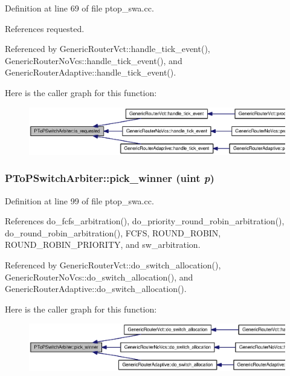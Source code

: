 Definition at line 69 of file ptop\_\-swa.cc.

References requested.

Referenced by GenericRouterVct::handle\_\-tick\_\-event(), GenericRouterNoVcs::handle\_\-tick\_\-event(), and GenericRouterAdaptive::handle\_\-tick\_\-event().

Here is the caller graph for this function:\nopagebreak
\begin{figure}[H]
\begin{center}
\leavevmode
\includegraphics[width=332pt]{classPToPSwitchArbiter_3c4eeb723ecb521a82a4518820e48896_icgraph}
\end{center}
\end{figure}
\subsubsection[{pick\_\-winner}]{ PToPSwitchArbiter::pick\_\-winner ({\bf uint} {\em p})}\label{classPToPSwitchArbiter_8b304c2fc07b6c0d55ce25b621a9f685}




Definition at line 99 of file ptop\_\-swa.cc.

References do\_\-fcfs\_\-arbitration(), do\_\-priority\_\-round\_\-robin\_\-arbitration(), do\_\-round\_\-robin\_\-arbitration(), FCFS, ROUND\_\-ROBIN, ROUND\_\-ROBIN\_\-PRIORITY, and sw\_\-arbitration.

Referenced by GenericRouterVct::do\_\-switch\_\-allocation(), GenericRouterNoVcs::do\_\-switch\_\-allocation(), and GenericRouterAdaptive::do\_\-switch\_\-allocation().

Here is the caller graph for this function:\nopagebreak
\begin{figure}[H]
\begin{center}
\leavevmode
\includegraphics[width=420pt]{classPToPSwitchArbiter_8b304c2fc07b6c0d55ce25b621a9f685_icgraph}
\end{center}
\end{figure}
